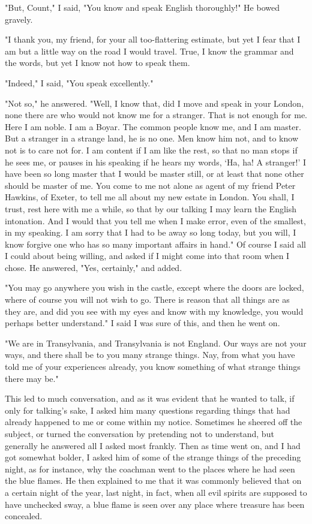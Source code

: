 "But, Count," I said, "You know and speak English thoroughly!" He bowed gravely. 

"I thank you, my friend, for your all too-flattering estimate, but yet I fear that I am but a little way on the road I would travel. True, I know the grammar and the words, but yet I know not how to speak them. 

"Indeed," I said, "You speak excellently." 

"Not so," he answered. "Well, I know that, did I move and speak in your London, none there are who would not know me for a stranger. That is not enough for me. Here I am noble. I am a Boyar. The common people know me, and I am master. But a stranger in a strange land, he is no one. Men know him not, and to know not is to care not for. I am content if I am like the rest, so that no man stops if he sees me, or pauses in his speaking if he hears my words, `Ha, ha! A stranger!' I have been so long master that I would be master still, or at least that none other should be master of me. You come to me not alone as agent of my friend Peter Hawkins, of Exeter, to tell me all about my new estate in London. You shall, I trust, rest here with me a while, so that by our talking I may learn the English intonation. And I would that you tell me when I make error, even of the smallest, in my speaking. I am sorry that I had to be away so long today, but you will, I know forgive one who has so many important affairs in hand." Of course I said all I could about being willing, and asked if I might come into that room when I chose. He answered, "Yes, certainly," and added. 

"You may go anywhere you wish in the castle, except where the doors are locked, where of course you will not wish to go. There is reason that all things are as they are, and did you see with my eyes and know with my knowledge, you would perhaps better understand." I said I was sure of this, and then he went on. 

"We are in Transylvania, and Transylvania is not England. Our ways are not your ways, and there shall be to you many strange things. Nay, from what you have told me of your experiences already, you know something of what strange things there may be." 

This led to much conversation, and as it was evident that he wanted to talk, if only for talking's sake, I asked him many questions regarding things that had already happened to me or come within my notice. Sometimes he sheered off the subject, or turned the conversation by pretending not to understand, but generally he answered all I asked most frankly. Then as time went on, and I had got somewhat bolder, I asked him of some of the strange things of the preceding night, as for instance, why the coachman went to the places where he had seen the blue flames. He then explained to me that it was commonly believed that on a certain night of the year, last night, in fact, when all evil spirits are supposed to have unchecked sway, a blue flame is seen over any place where treasure has been concealed. 

